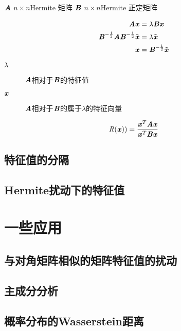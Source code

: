 $\MA$ $n \times n$Hermite 矩阵
$\MB$ $n \times n$Hermite 正定矩阵

\begin{definition}
    $$
    \begin{aligned}
        \MA \Vx & = \lambda \MB \Vx \\
        \MB^{-\frac{1}{2}}\MA \MB^{- \frac{1}{2}}\tilde{\Vx} & = \lambda \tilde{\Vx} \\
        \Vx & = \MB^{-\frac{1}{2}}\tilde{\Vx}
    \end{aligned}
    $$
    \begin{description}
        \item[$\lambda$] $\MA$相对于$\MB$的特征值
        \item[$\Vx$] $\MA$相对于$\MB$的属于$\lambda$的特征向量
    \end{description}
\end{definition}

\begin{definition}
    $$
    \SR(\Vx)) = \frac{\Vx^T \MA \Vx}{\Vx^T \MB \Vx}
    $$
\end{definition}

\subsection{特征值的分隔}
\label{sub:特征值的分隔}

\subsection{Hermite扰动下的特征值}
\label{sub:Hermite扰动下的特征值}

\section{一些应用}
\label{sec:一些应用}

\subsection{与对角矩阵相似的矩阵特征值的扰动}
\label{sub:与对角矩阵相似的矩阵特征值的扰动}

\subsection{主成分分析}
\label{sub:主成分分析}

\subsection{概率分布的Wasserstein距离}
\label{sub:概率分布的Wasserstein距离}
